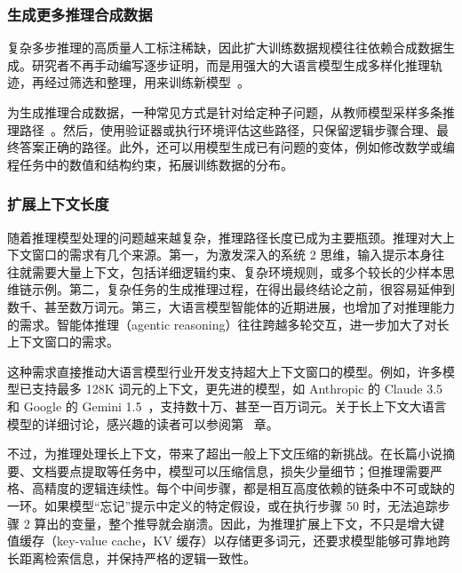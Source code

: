 \subsubsection{生成更多推理合成数据}

复杂多步推理的高质量人工标注稀缺，因此扩大训练数据规模往往依赖合成数据生成。研究者不再手动编写逐步证明，而是用强大的大语言模型生成多样化推理轨迹，再经过筛选和整理，用来训练新模型~\cite{zelikman-etal:2022star,mukherjee-etal:2023orca}。

为生成推理合成数据，一种常见方式是针对给定种子问题，从教师模型采样多条推理路径~\cite{wang-etal:2023self}。然后，使用验证器或执行环境评估这些路径，只保留逻辑步骤合理、最终答案正确的路径。此外，还可以用模型生成已有问题的变体，例如修改数学或编程任务中的数值和结构约束，拓展训练数据的分布。

\subsubsection{扩展上下文长度}

随着推理模型处理的问题越来越复杂，推理路径长度已成为主要瓶颈。推理对大上下文窗口的需求有几个来源。第一，为激发深入的系统 2 思维，输入提示本身往往就需要大量上下文，包括详细逻辑约束、复杂环境规则，或多个较长的少样本思维链示例。第二，复杂任务的生成推理过程，在得出最终结论之前，很容易延伸到数千、甚至数万词元。第三，大语言模型智能体的近期进展，也增加了对推理能力的需求。智能体推理（agentic reasoning）往往跨越多轮交互，进一步加大了对长上下文窗口的需求。

这种需求直接推动大语言模型行业开发支持超大上下文窗口的模型。例如，许多模型已支持最多 128K 词元的上下文，更先进的模型，如 Anthropic 的 Claude 3.5~\cite{anthropic:2024claude35} 和 Google 的 Gemini 1.5~\cite{gemini:2024gemini}，支持数十万、甚至一百万词元。关于长上下文大语言模型的详细讨论，感兴趣的读者可以参阅第 \ChapterLLM\ 章。

不过，为推理处理长上下文，带来了超出一般上下文压缩的新挑战。在长篇小说摘要、文档要点提取等任务中，模型可以压缩信息，损失少量细节；但推理需要严格、高精度的逻辑连续性。每个中间步骤，都是相互高度依赖的链条中不可或缺的一环。如果模型“忘记”提示中定义的特定假设，或在执行步骤 50 时，无法追踪步骤 2 算出的变量，整个推导就会崩溃。因此，为推理扩展上下文，不只是增大键值缓存（key-value cache，KV 缓存）以存储更多词元，还要求模型能够可靠地跨长距离检索信息，并保持严格的逻辑一致性。


